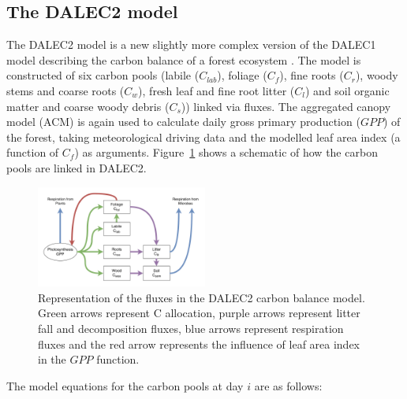\subsection{The DALEC2 model} \label{chap5:sec:dalec2}

The DALEC2 model is a new slightly more complex version of the DALEC1 model \citep{williams2005improved} describing the carbon balance of a forest ecosystem \citep{Bloom2015}. The model is constructed of six carbon pools (labile ($C_{lab}$), foliage ($C_f$), fine roots ($C_r$), woody stems and coarse roots ($C_w$), fresh leaf and fine root litter ($C_l$) and soil organic matter and coarse woody debris ($C_s$)) linked via fluxes. The aggregated canopy model (ACM) \citep{williams1997predicting} is again used to calculate daily gross primary production ($GPP$) of the forest, taking meteorological driving data and the modelled leaf area index (a function of $C_f$) as arguments. Figure~\ref{fig:DALEC_mod} shows a schematic of how the carbon pools are linked in DALEC2.   

\begin{figure}[ht]
    \centering
    \includegraphics[width=0.5\textwidth]{chapter/chapter5/dalec2diag.pdf}
    \caption{Representation of the fluxes in the DALEC2 carbon balance model. Green arrows represent C allocation, purple arrows represent litter fall and decomposition fluxes, blue arrows represent respiration fluxes and the red arrow represents the influence of leaf area index in the $GPP$ function.} \label{fig:DALEC_mod}
\end{figure}

The model equations for the carbon pools at day $i$ are as follows:

